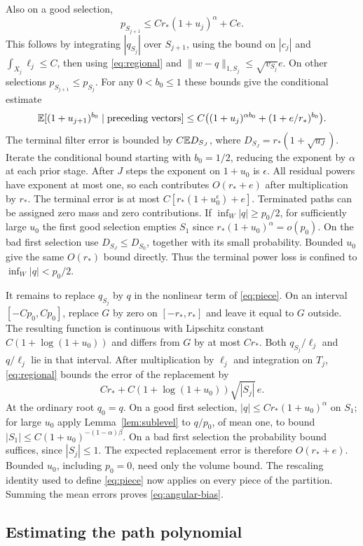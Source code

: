 Also on a good selection,
\[
 p_{S_{j+1}}\le C r_*(1+u_j)^\alpha+Ce.
\]
This follows by integrating \(|q_{S_j}|\) over \(S_{j+1}\),
using the bound on \(|c_j|\) and \(\int_{X_j}\ell_j\le C\),
then using \eqref{eq:regional} and
\(\|w-q\|_{1,S_j}\le\sqrt{v_{S_j}}e\).
On other selections \(p_{S_{j+1}}\le p_{S_j}\).
For any \(0<b_0\le1\) these bounds give the conditional estimate
\[
 \mathbb E[(1+u_{j+1})^{b_0}\mid\text{preceding vectors}]
 \le C\bigl((1+u_j)^{\alpha b_0}+(1+e/r_*)^{b_0}\bigr).
\]
The terminal filter error is bounded by \(C\mathbb E D_{S_J}\),
where \(D_{S_J}=r_*(1+\sqrt{u_J})\).
Iterate the conditional bound starting with \(b_0=1/2\),
reducing the exponent by \(\alpha\) at each prior stage.
After \(J\) steps the exponent on \(1+u_0\) is \(\epsilon\).
All residual powers have exponent at most one, so each
contributes \(O(r_*+e)\) after multiplication by \(r_*\).
The terminal error is at most \(C[r_*(1+u_0^\epsilon)+e]\). Terminated paths
can be assigned zero mass and zero contributions.
If \(\inf_W|q|\ge p_0/2\), for sufficiently large \(u_0\)
the first good selection empties \(S_1\) since
\(r_*(1+u_0)^\alpha=o(p_0)\). On the bad first selection
use \(D_{S_J}\le D_{S_0}\), together with its small
probability. Bounded \(u_0\) give the same \(O(r_*)\) bound
directly. Thus the terminal power loss is confined to
\(\inf_W|q|<p_0/2\).

It remains to replace \(q_{S_j}\) by \(q\) in the nonlinear
term of \eqref{eq:piece}. On an interval
\([-C p_0,C p_0]\), replace \(G\) by zero on
\([-r_*,r_*]\) and leave it equal to \(G\) outside.
The resulting function is continuous with Lipschitz constant
\(C(1+\log(1+u_0))\) and differs from \(G\) by at most \(C r_*\).
Both \(q_{S_j}/\ell_j\) and \(q/\ell_j\) lie in that interval.
After multiplication by \(\ell_j\) and integration on \(T_j\),
\eqref{eq:regional} bounds the error of the replacement by
\[
 C r_*+ C(1+\log(1+u_0))\sqrt{|S_j|}\,e .
\]
At the ordinary root \(q_0=q\). On a good first selection,
\(|q|\le C r_*(1+u_0)^\alpha\) on \(S_1\); for large \(u_0\)
apply Lemma~\ref{lem:sublevel} to \(q/p_0\), of mean one, to
bound \(|S_1|\le C(1+u_0)^{-(1-\alpha)\beta}\).
On a bad first selection the probability bound suffices, since
\(|S_j|\le1\). The expected replacement error is therefore
\(O(r_*+e)\). Bounded \(u_0\), including \(p_0=0\),
need only the volume bound. The rescaling identity used to define \eqref{eq:piece} now
applies on every piece of the partition. Summing the mean
errors proves \eqref{eq:angular-bias}.

\subsection{Estimating the path polynomial}


